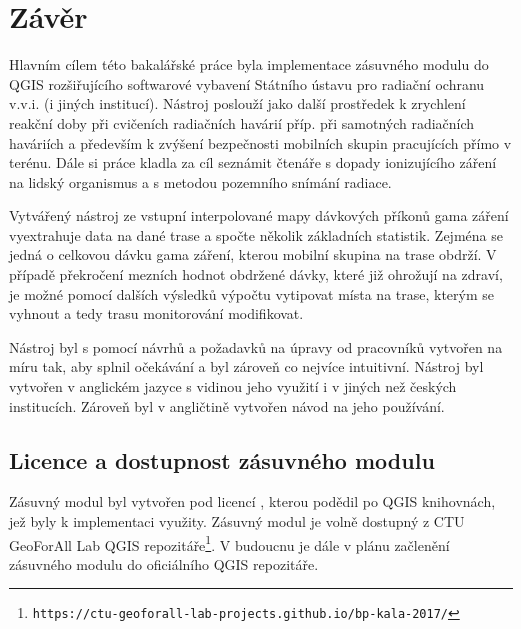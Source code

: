 \chapter{Závěr}
\label{5-zaver}

Hlavním cílem této bakalářské práce byla implementace zásuvného modulu do QGIS rozšiřujícího softwarové vybavení Státního ústavu pro radiační ochranu v.v.i. (i jiných institucí). Nástroj poslouží jako další prostředek k zrychlení reakční doby při cvičeních radiačních havárií příp. při samotných radiačních haváriích a především k zvýšení bezpečnosti mobilních skupin pracujících přímo v terénu. Dále si práce kladla za cíl seznámit čtenáře s dopady ionizujícího záření na lidský organismus a s metodou pozemního snímání radiace. 

Vytvářený nástroj ze vstupní interpolované mapy dávkových příkonů gama záření vyextrahuje data na dané trase a spočte několik základních statistik. Zejména se jedná o celkovou dávku gama záření, kterou mobilní skupina na trase obdrží. V případě překročení mezních hodnot obdržené dávky, které již ohrožují na zdraví, je možné pomocí dalších výsledků výpočtu vytipovat místa na trase, kterým se vyhnout a tedy trasu monitorování modifikovat. 

Nástroj byl s pomocí návrhů a požadavků na úpravy od pracovníků  vytvořen na míru tak, aby splnil očekávání a byl zároveň co nejvíce intuitivní. Nástroj byl vytvořen v anglickém jazyce s vidinou jeho využití i v jiných než českých institucích. Zároveň byl v angličtině vytvořen návod na jeho používání. 


\section{Licence a dostupnost zásuvného modulu}
Zásuvný modul byl vytvořen pod licencí , kterou podědil po QGIS knihovnách, jež byly k implementaci využity. Zásuvný modul je volně dostupný z CTU GeoForAll Lab QGIS repozitáře\footnote{\texttt{https://ctu-geoforall-lab-projects.github.io/bp-kala-2017/}}. V budoucnu je dále v plánu začlenění zásuvného modulu do oficiálního QGIS repozitáře.


 



